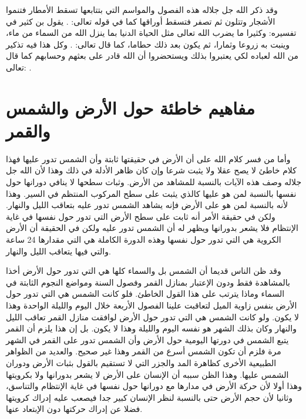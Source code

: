 وقد ذكر الله جل جلاله هذه الفصول والمواسم التي بتتابعها تسقط الأمطار فتنموا الأشجار وتتلون ثم تصفر فتسقط أوراقها كما في قوله تعالى: \quranayah*[39][21]{\footnotesize \surahname*[39]}. يقول بن كثير في تفسيره: وكثيرا ما يضرب الله تعالى مثل الحياة الدنيا بما ينزل الله من السماء من ماء، وينبت به زروعا وثمارا، ثم يكون بعد ذلك حطاما، كما قال تعالى: \quranayah*[18][45]{\footnotesize \surahname*[18]} \href{https://shamela.ws/book/8473/3591#p4}{\faExternalLink} \cite{tafsir_ibnKathir}. وكل هذا فيه تذكير من الله لعباده لكي يعتبروا بذلك ويستحضروا أن الله قادر على بعثهم وحسابهم كما قال تعالى: \quranayah*[30][50]{\footnotesize \surahname*[9]}. 

\section{مفاهيم خاطئة حول الأرض والشمس والقمر}

وأما من فسر كلام الله على أن الأرض في حقيقتها ثابتة وأن الشمس تدور عليها فهذا كلام خاطئ لا يصح عقلا ولا يثبت شرعا وإن كان ظاهر الأدلة في ذلك وهذا لأن الله جل جلاله وصف هذه الآيات بالنسبة للمشاهد من الأرض. وثبات سطحها لا ينافي دورانها حول نفسها بالنسبة لمن هو عليها كالذي يثبت على سطح المركوب المنتظم في السير. وهذا لأنه بالنسبة لمن هو على الأرض فإنه يشاهد الشمس تدور عليه بتعاقب الليل والنهار. ولكن في حقيقة الأمر أنه ثابت على سطح الأرض التي تدور حول نفسها في غاية الإنتظام فلا يشعر بدورانها ويظهر له أن الشمس تدور عليه ولكن في الحقيقة أن الأرض الكروية هي التي تدور حول نفسها وهذه الدورة الكاملة هي التي مقدارها 24 ساعة والتي فيها يتعاقب الليل والنهار.

وقد ظن الناس قديما أن الشمس بل والسماء كلها هي التي تدور حول الأرض أخذا بالمشاهدة فقط ودون الإعتبار بمنازل القمر وفصول السنة ومواضع النجوم الثابتة في السماء وماذا يترتب على هذا القول الخاطئ. فلو كانت الشمس هي التي تدور حول الأرض بنفس زاوية الميل لتعاقبت علينا الفصول الأربعة خلال اليوم والليلة الواحدة وهذا لا يكون. ولو كانت الشمس هي التي تدور حول الأرض لوافقت منازل القمر تعاقب الليل والنهار وكان بذلك الشهر هو نفسه اليوم والليلة وهذا لا يكون. بل إن هذا يلزم أن القمر يتبع الشمس في دورتها اليومية حول الأرض وأن الشمس تدور على القمر في الشهر مرة فلزم أن تكون الشمس أسرع من القمر وهذا غير صحيح. والعديد من الظواهر الطبيعية الأخرى كظاهرة المد والجزر التي لا تستقيم بالقول بثبات الأرض ودوران الشمس عليها. وهذا الظن سببه أن الإنسان على الأرض لا يشعر بدورانها ولا بكرويتها وهذا أولا لأن حركة الأرض في مدارها مع دورانها حول نفسها في غاية الإنتظام والتناسق، وثانيا لأن حجم الأرض حتى بالنسبة لنظر الإنسان كبير جدا فيصعب عليه إدراك كرويتها فضلا عن إدراك حركتها دون الإبتعاد عنها.

